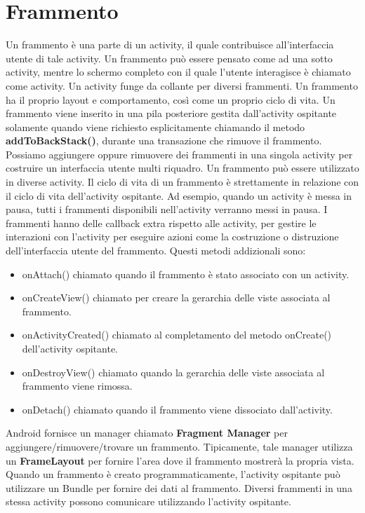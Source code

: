\section{Frammento}
Un frammento è una parte di un activity, il quale contribuisce all'interfaccia utente di tale activity. Un frammento può essere pensato come ad una sotto activity, mentre lo schermo completo con il quale l'utente interagisce è chiamato come activity. Un activity funge da collante per diversi frammenti. Un frammento ha il proprio layout e comportamento, così come un proprio ciclo di vita. Un frammento viene inserito in una pila posteriore gestita dall’activity ospitante solamente quando viene richiesto esplicitamente chiamando il metodo \textbf{addToBackStack()}, durante una transazione che rimuove il frammento. Possiamo aggiungere oppure rimuovere dei frammenti in una singola activity per costruire un interfaccia utente multi riquadro. Un frammento può essere utilizzato in diverse activity. Il ciclo di vita di un frammento è strettamente in relazione con il ciclo di vita dell'activity ospitante. Ad esempio, quando un activity è messa in pausa, tutti i frammenti disponibili nell'activity verranno messi in pausa. I frammenti hanno delle callback extra rispetto alle activity, per gestire le interazioni con l'activity per eseguire azioni come la costruzione o distruzione dell'interfaccia utente del frammento. Questi metodi addizionali sono:
\begin{itemize}
\item onAttach() chiamato quando il frammento è stato associato con un activity.
\item onCreateView() chiamato per creare la gerarchia delle viste associata al frammento.
\item onActivityCreated() chiamato al completamento del metodo onCreate() dell'activity ospitante.
\item onDestroyView() chiamato quando la gerarchia delle viste associata al frammento viene rimossa.
\item onDetach() chiamato quando il frammento viene dissociato dall'activity.
\end{itemize} 
Android fornisce un manager chiamato \textbf{Fragment Manager} per aggiungere/rimuovere/trovare un frammento. Tipicamente, tale manager utilizza un \textbf{FrameLayout} per fornire l'area dove il frammento mostrerà la propria vista. Quando un frammento è creato programmaticamente, l'activity ospitante può utilizzare un Bundle per fornire dei dati al frammento. Diversi frammenti in una stessa activity possono comunicare utilizzando l'activity ospitante.

